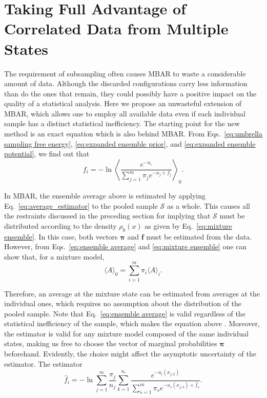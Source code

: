 \documentclass[aip,jcp,preprint,amsmath,amssymb]{revtex4-1}
\newcommand{\vt}[1]{\boldsymbol{\mathbf{#1}}}           %
\begin{document}
\section{Taking Full Advantage of Correlated Data from Multiple States}

The requirement of subsampling often causes MBAR to waste a considerable amount of data. Although the discarded configurations carry less information than do the ones that remain, they could possibly have a positive impact on the quality of a statistical analysis. Here we propose an unwasteful extension of MBAR, which allows one to employ all available data even if each individual sample has a distinct statistical inefficiency. The starting point for the new method is an exact equation which is also behind MBAR. From Eqs.~\eqref{eq:umbrella sampling free energy}, \eqref{eq:expanded ensemble prior}, and \eqref{eq:expanded ensemble potential}, we find out that
\begin{equation}
\label{eq:mbar free energy exact}
f_i = -\ln \left\langle \frac{e^{-u_i}}{\sum_{j=1}^m \pi_j e^{-u_j + f_j}} \right\rangle_0.
\end{equation}

In MBAR, the ensemble average above is estimated by applying Eq.~\eqref{eq:average_estimator} to the pooled sample $\mathcal S$ as a whole. This causes all the restraints discussed in the preceding section for implying that $\mathcal S$ must be distributed according to the density $\rho_0(x)$ as given by Eq.~\eqref{eq:mixture ensemble}. In this case, both vectors $\vt \pi$ and $\vt f$ must be estimated from the data. However, from Eqs.~\eqref{eq:ensemble average} and \eqref{eq:mixture ensemble} one can show that, for a mixture model,
\begin{equation}
\label{eq:mblock average}
\langle A \rangle_0 = \sum_{i=1}^m \pi_i \langle A \rangle_i.
\end{equation}

Therefore, an average at the mixture state can be estimated from averages at the individual ones, which requires no assumption about the distribution of the pooled sample. Note that Eq.~\eqref{eq:ensemble average} is valid regardless of the statistical inefficiency of the sample, which makes the equation above . Moreover, the estimator is valid for any mixture model composed of the same individual states, making us free to choose the vector of marginal probabilities $\vt \pi$ beforehand. Evidently, the choice might affect the asymptotic uncertainty of the estimator. The estimator 
\begin{equation}
\label{eq:mblock free energy exact}
{\hat f}_i = -\ln \sum_{j=1}^m \frac{\pi_j}{n_j} \sum_{k=1}^{n_i} \frac{e^{-u_i(x_{j,k})}}{\sum_{s=1}^m \pi_s e^{-u_s(x_{j,k}) + {\hat f}_s}}.
\end{equation}
\end{document}
